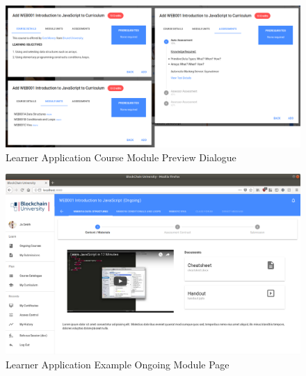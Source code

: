 \begin{figure}[!ht]
	\centering
	\includegraphics[width=1.0\textwidth]{Learner_cmdetails}
	\caption[Learner Application Course Module Preview Dialogue]
	{Learner Application Course Module Preview Dialogue}
	\label{fig:Learner_cmdetails}
\end{figure}

\begin{figure}[!ht]
	\centering
	\includegraphics[width=1.0\textwidth]{Learner_ongoing1}
	\caption[Learner Application Example Ongoing Module Page]
	{Learner Application Example Ongoing Module Page}
	\label{fig:Learner_ongoing1}
\end{figure}

